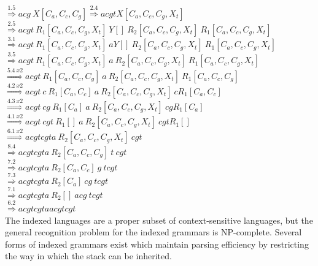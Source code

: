 \documentclass[11pt]{article}
\begin{document}
\indent\indent$            \overset{1.5}{\Rightarrow} acg \ X[C_a, C_c, C_g] \overset{2.4}{\Rightarrow} acgt X[C_a, C_c, C_g, X_t] $ \\
\indent\indent$            \overset{2.5}{\Rightarrow} acgt \ R_1[C_a, C_c, C_g, X_t] \ Y[] \ R_2[C_a, C_c, C_g, X_t] \ R_1[C_a, C_c, C_g, X_t] $ \\
\indent\indent$            \overset{3.1}{\Rightarrow} acgt \ R_1[C_a, C_c, C_g, X_t] \ aY[] \ R_2[C_a, C_c, C_g, X_t] \ R_1[C_a, C_c, C_g, X_t] $ \\
\indent\indent$            \overset{3.5}{\Rightarrow} acgt \ R_1[C_a, C_c, C_g, X_t] \ a \ R_2[C_a, C_c, C_g, X_t] \ R_1[C_a, C_c, C_g, X_t] $ \\
\indent\indent$            \overset{5.4 \ x2}{\Rightarrow} acgt \ R_1[C_a, C_c, C_g] \ a \ R_2[C_a, C_c, C_g, X_t] \ R_1[C_a, C_c, C_g] $ \\
\indent\indent$            \overset{4.2 \ x2}{\Rightarrow} acgt \ c \ R_1[C_a, C_c] \ a \ R_2[C_a, C_c, C_g, X_t] \ cR_1[C_a, C_c] $ \\
\indent\indent$            \overset{4.3 \ x2}{\Rightarrow} acgt \ cg \ R_1[C_a] \ a \ R_2[C_a, C_c, C_g, X_t] \ cg R_1[C_a] $ \\
\indent\indent$            \overset{4.1 \ x2}{\Rightarrow} acgt \ cgt \ R_1[] \ a \ R_2[C_a, C_c, C_g, X_t] \ cgt R_1[] $ \\
\indent\indent$            \overset{6.1 \ x2}{\Rightarrow} acgtcgta \ R_2[C_a, C_c, C_g, X_t] \ cgt $ \\
\indent\indent$            \overset{8.4}{\Rightarrow} acgtcgta \ R_2[C_a, C_c, C_g] \ t \ cgt $ \\
\indent\indent$            \overset{7.2}{\Rightarrow} acgtcgta \ R_2[C_a, C_c] \ g \ t cgt $ \\
\indent\indent$            \overset{7.3}{\Rightarrow} acgtcgta \ R_2[C_a] \ cg \ t cgt $ \\
\indent\indent$            \overset{7.1}{\Rightarrow} acgtcgta \ R_2[] \ acg \ t cgt $ \\
\indent\indent$            \overset{6.2}{\Rightarrow} acgtcgtaacgtcgt $ \\

The indexed languages are a proper subset of context-sensitive languages, but the general recognition problem for the indexed grammars is NP-complete. 
Several forms of indexed grammars exist which maintain parsing efficiency by restricting the way in which the stack can be inherited.\\
\end{document}
